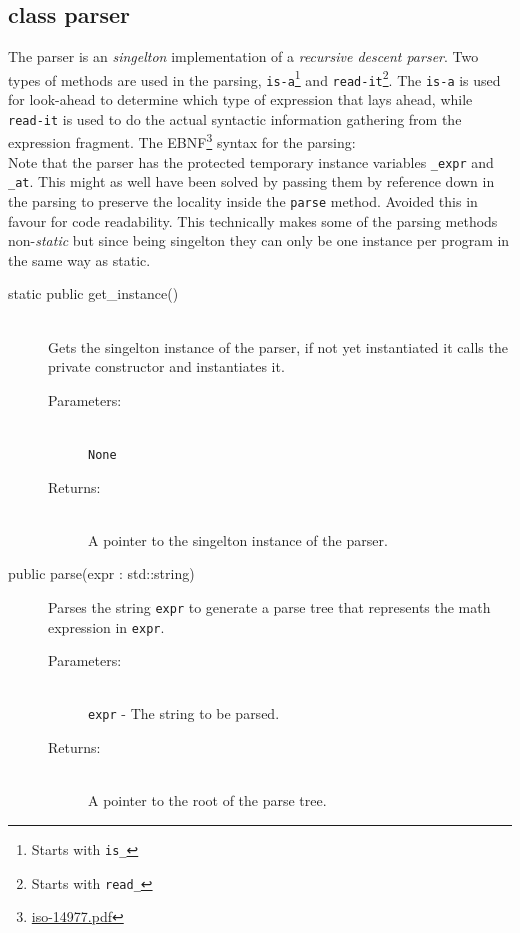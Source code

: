 \documentclass[a4paper,11pt]{kth-mag}
\begin{document}
\subsection{class parser}
The parser is an \emph{singelton} implementation of a \emph{recursive descent parser}. Two
types of methods are used in the parsing, \texttt{is-a}\footnote{Starts with
\texttt{is\_}} and \texttt{read-it}\footnote{Starts with \texttt{read\_}}.
The \texttt{is-a} is used for look-ahead to determine which type of expression
that lays ahead, while \texttt{read-it} is used to do the actual syntactic 
information gathering from the expression fragment.
The EBNF\footnote{\href{www.cl.cam.ac.uk/~mgk25/iso-14977.pdf}{iso-14977.pdf}}
syntax for the parsing:\\


Note that the parser has the protected temporary instance variables \texttt{\_expr} and
\texttt{\_at}. This might as well have been solved by passing them by reference down in the
parsing to preserve the locality inside the \texttt{parse} method. Avoided this
in favour for code readability. This technically makes some of the parsing 
methods non-\emph{static} but since being singelton they can only be one 
instance per program in the same way as static.

\begin{description}
    \item[static public get\_instance()]~\\
    Gets the singelton instance of the parser, if not yet instantiated it calls
    the private constructor and instantiates it.
    \begin{description}
        \item[Parameters:]~\\
            \verb+None+
        \item[Returns:]~\\
            A pointer to the singelton instance of the parser.
    \end{description}
\end{description}

\begin{description}
    \item[public parse(expr : std::string)] Parses the string \texttt{expr} to
    generate a parse tree that represents the math expression in \texttt{expr}.
    \begin{description}
        \item[Parameters:]~\\
            \verb+expr+ - The string to be parsed.
        \item[Returns:]~\\
            A pointer to the root of the parse tree.
    \end{description}
\end{description}
\end{document}
